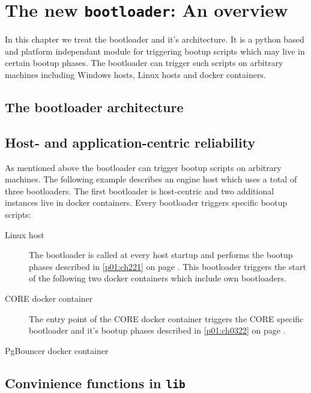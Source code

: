 \chapter{The new \texttt{bootloader}: An overview}\label{p01:ch04}
In this chapter we treat the bootloader and it's architecture. It is a python based and platform independant module for triggering bootup scripts which may live in certain bootup phases. The bootloader can trigger such scripts on arbitrary machines including Windows hosts, Linux hosts and docker containers.
	\section{The bootloader architecture}
	\section{Host- and application-centric reliability}
	As mentioned above the bootloader can trigger bootup scripts on arbitrary machines. The following example describes an engine host which uses a total of three bootloaders. The first bootloader is host-centric and two additional instances live in docker containers. Every bootloader triggers specific bootup scripts:
	\begin{description}
		\item[Linux host] The bootloader is called at every host startup and performs the bootup phases described in \ref{p01:ch221} on page \pageref{p01:ch221}. This bootloader triggers the start of the following two docker containers which include own bootloaders.
		\item[CORE docker container] The entry point of the CORE docker container triggers the CORE specific bootloader and it's bootup phases described in \ref{p01:ch0322} on page \pageref{p01:ch0322}.
		\item[PgBouncer docker container]
	\end{description}
	\section{Convinience functions in \texttt{lib}}
